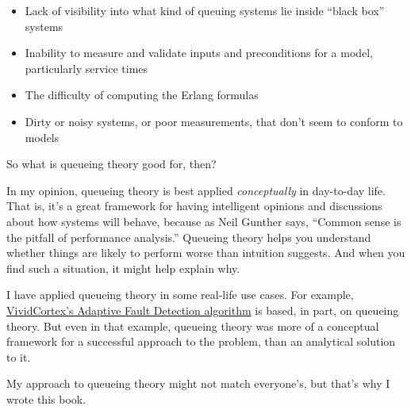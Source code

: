\documentclass{vivid_layout_pdf}
\begin{document}
\begin{itemize}
\item Lack of visibility into what kind of queuing systems lie inside ``black box'' systems
\item Inability to measure and validate inputs and preconditions for a model, particularly service times
\item The difficulty of computing the Erlang formulas
\item Dirty or noisy systems, or poor measurements, that don't seem to conform to models
\end{itemize}

So what is queueing theory good for, then?

In my opinion, queueing theory is best applied {\itshape conceptually} in day-to-day life. That is, it's a great framework for having intelligent opinions and discussions about how systems will behave, because as Neil Gunther says, ``Common sense is the pitfall of performance analysis.'' Queueing theory helps you understand whether things are likely to perform worse than intuition suggests. And when you find such a situation, it might help explain why.

I have applied queueing theory in some real-life use cases. For example, \href{https://www.vividcortex.com/blog/2013/04/17/how-does-adaptive-fault-detection-work-does-it-really-eliminate-thresholds/}{VividCortex's Adaptive Fault Detection algorithm} is based, in part, on queueing theory. But even in that example, queueing theory was more of a conceptual framework for a successful approach to the problem, than an analytical solution to it.

My approach to queueing theory might not match everyone's, but that's why I wrote this book.
\end{document}
